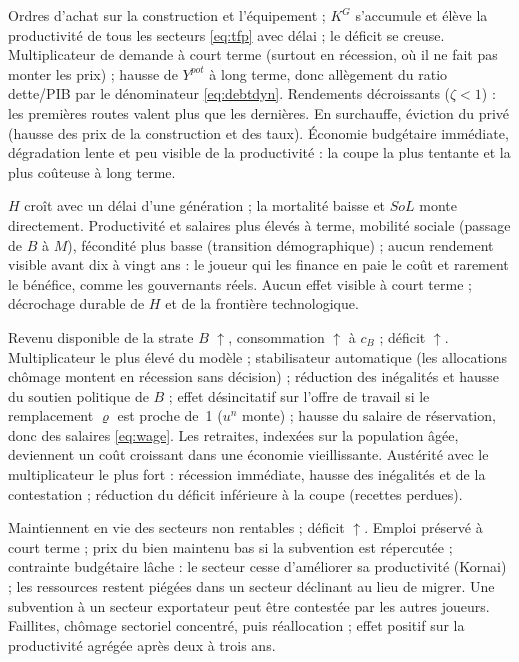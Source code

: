 \documentclass[11pt,a4paper]{article}
\newcommand{\up}{$\uparrow$}
\begin{document}
\direct Ordres d'achat sur la construction et l'équipement ; $K^G$ s'accumule et élève la productivité de tous les secteurs \eqref{eq:tfp} avec délai ; le déficit se creuse.
\second Multiplicateur de demande à court terme (surtout en récession, où il ne fait pas monter les prix) ; hausse de $Y^{pot}$ à long terme, donc allègement du ratio dette/PIB par le dénominateur \eqref{eq:debtdyn}. Rendements décroissants ($\zeta<1$) : les premières routes valent plus que les dernières. En surchauffe, éviction du privé (hausse des prix de la construction et des taux).
\baisse Économie budgétaire immédiate, dégradation lente et peu visible de la productivité : la coupe la plus tentante et la plus coûteuse à long terme.

\direct $H$ croît avec un délai d'une génération ; la mortalité baisse et $SoL$ monte directement.
\second Productivité et salaires plus élevés à terme, mobilité sociale (passage de $B$ à $M$), fécondité plus basse (transition démographique) ; aucun rendement visible avant dix à vingt ans : le joueur qui les finance en paie le coût et rarement le bénéfice, comme les gouvernants réels.
\baisse Aucun effet visible à court terme ; décrochage durable de $H$ et de la frontière technologique.

\direct Revenu disponible de la strate $B$ \up, consommation \up{} à $c_B$ ; déficit \up.
\second Multiplicateur le plus élevé du modèle ; stabilisateur automatique (les allocations chômage montent en récession sans décision) ; réduction des inégalités et hausse du soutien politique de $B$ ; effet désincitatif sur l'offre de travail si le remplacement $\varrho$ est proche de~1 ($u^n$ monte) ; hausse du salaire de réservation, donc des salaires \eqref{eq:wage}. Les retraites, indexées sur la population âgée, deviennent un coût croissant dans une économie vieillissante.
\baisse Austérité avec le multiplicateur le plus fort : récession immédiate, hausse des inégalités et de la contestation ; réduction du déficit inférieure à la coupe (recettes perdues).

\direct Maintiennent en vie des secteurs non rentables ; déficit \up.
\second Emploi préservé à court terme ; prix du bien maintenu bas si la subvention est répercutée ; contrainte budgétaire lâche : le secteur cesse d'améliorer sa productivité (Kornai) ; les ressources restent piégées dans un secteur déclinant au lieu de migrer. Une subvention à un secteur exportateur peut être contestée par les autres joueurs.
\baisse Faillites, chômage sectoriel concentré, puis réallocation ; effet positif sur la productivité agrégée après deux à trois ans.
\end{document}
